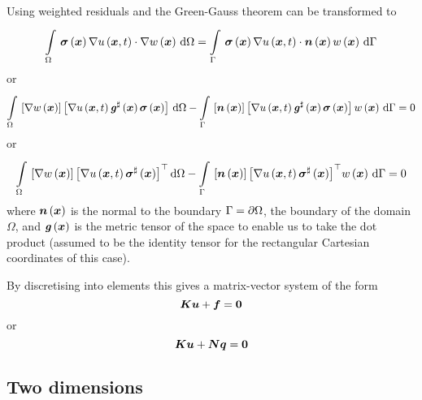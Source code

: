 Using weighted residuals and the Green-Gauss theorem
 can be transformed to
\begin{equation}
  \gint{\Omega}{}{\dotprod{\fnof{\conductivitytensor}{\vectr{x}}\gradient{}{\fnof{u}{\vectr{x},t}}}
    {\gradient{}{\fnof{w}{\vectr{x}}}}}{\Omega}=
  \gint{\Gamma}{}{\dotprod{\fnof{\conductivitytensor}{\vectr{x}}\gradient{}{\fnof{u}{\vectr{x},t}}}
    {\fnof{\normal}{\vectr{x}}}\fnof{w}{\vectr{x}}}{\Gamma}
\end{equation}
or
\begin{equation}
  \gint{\Omega}{}{\sqbrac{\gradient{}{\fnof{w}{\vectr{x}}}}
    \sqbrac{\gradient{}{\fnof{u}{\vectr{x},t}}\fnof{\sharptensor{\generalmetrictensor}}{\vectr{x}}
      \fnof{\conductivitytensor}{\vectr{x}}}}{\Omega}-
  \gint{\Gamma}{}{\sqbrac{\fnof{\normal}{\vectr{x}}}
    \sqbrac{\gradient{}{\fnof{u}{\vectr{x},t}}\fnof{\sharptensor{\generalmetrictensor}}{\vectr{x}}
      \fnof{\conductivitytensor}{\vectr{x}}}\fnof{w}{\vectr{x}}}{\Gamma}=0
\end{equation}
or
\begin{equation}
  \gint{\Omega}{}{\sqbrac{\gradient{}{\fnof{w}{\vectr{x}}}}
    \transpose{\sqbrac{\gradient{}{\fnof{u}{\vectr{x},t}}\fnof{\sharptensor{\conductivitytensor}}{\vectr{x}}}}}{\Omega}-
  \gint{\Gamma}{}{\sqbrac{\fnof{\normal}{\vectr{x}}}
    \transpose{\sqbrac{\gradient{}{\fnof{u}{\vectr{x},t}}\fnof{\sharptensor{\conductivitytensor}}{\vectr{x}}}}
    \fnof{w}{\vectr{x}}}{\Gamma}=0
  \label{eqn:ElementMatricesGenLaplaceStartingEqution}
\end{equation}
where $  \boldsymbol{n} \left(  \boldsymbol{x}  \right) $ is the normal to the boundary
$\Gamma= \partial{\Omega} $, the boundary of the domain $\Omega$, and
$  \boldsymbol{\mathit{ g }} \left(  \boldsymbol{x}  \right) $ is the metric tensor of the
space to enable us to take the dot product (assumed to be the identity
tensor for the rectangular Cartesian coordinates of this case).

By discretising into elements this gives a matrix-vector system of the form
\begin{equation}
  \matr{K}\vect{u}+\vect{f}=\vect{0}
\end{equation}
or
\begin{equation}
  \matr{K}\vect{u}+\matr{N}\vectr{q}=\vect{0}
\end{equation}

\subsection{Two dimensions}
\label{subsec:ElementStiffnessMatrixGenLaplace2D}

